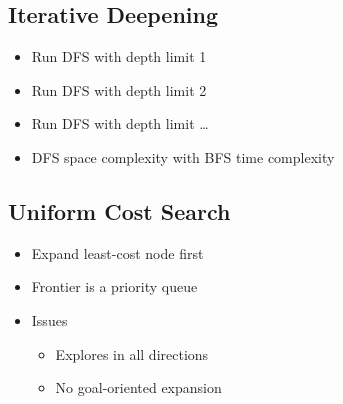\documentclass[11pt]{article}
\begin{document}
\subsection{Iterative Deepening}
\label{sec:org63b695a}
\begin{itemize}
\item Run DFS with depth limit 1
\item Run DFS with depth limit 2
\item Run DFS with depth limit \ldots{}
\item DFS space complexity with BFS time complexity
\end{itemize}

\subsection{Uniform Cost Search}
\label{sec:org4e7705b}
\begin{itemize}
\item Expand least-cost node first
\item Frontier is a priority queue
\item Issues
\begin{itemize}
\item Explores in all directions
\item No goal-oriented expansion
\end{itemize}
\end{itemize}
\end{document}
